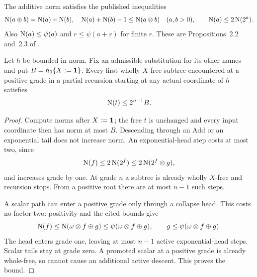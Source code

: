 The additive norm satisfies the published inequalities
\[
 \operatorname{N}(a\oplus b)=\operatorname{N}(a)+\operatorname{N}(b),\quad
 \operatorname{N}(a)+\operatorname{N}(b)-1\le\operatorname{N}(a\otimes b)\quad(a,b>0),
 \qquad \operatorname{N}(a)\le2\operatorname{N}(2^a).
\]
Also $\operatorname{N}(a)\le\psi(a)$ and $r\le\psi(a+r)$ for finite $r$.
These are Propositions~2.2 and~2.3 of \cite{ww}.

\begin{lemma}\label{wwsc:lem:free}
Let $h$ be bounded in norm. Fix an admissible substitution for its other
names and put $B=h_0\{X:=\mathbf1\}$. Every first wholly $X$-free
subtree encountered at a positive grade in a partial recursion starting
at any actual coordinate of $h$ satisfies
\[
 \operatorname{N}(t)\le2^{n-1}B.
\]
\end{lemma}
\begin{proof}
Compute norms after $X:=\mathbf1$; the free $t$ is unchanged and every
input coordinate then has norm at most $B$. Descending through an Add
or an exponential tail does not increase norm. An exponential-head
step costs at most two, since
\[
 \operatorname{N}(f)\le2\operatorname{N}(2^f)\le2\operatorname{N}(2^f\otimes g),
\]
and increases grade by one. At grade $n$ a subtree is already wholly
$X$-free and recursion stops. From a positive root there are at most
$n-1$ such steps.

A scalar path can enter a positive grade only through a collapse head.
This costs no factor two: positivity and the cited bounds give
\[
 \operatorname{N}(f)\le\operatorname{N}(\omega\otimes f\oplus g)
                  \le\psi(\omega\otimes f\oplus g),\qquad
 g\le\psi(\omega\otimes f\oplus g).
\]
The head enters grade one, leaving at most $n-1$ active
exponential-head steps. Scalar tails stay at grade zero. A promoted
scalar at a positive grade is already whole-free, so cannot cause an
additional active descent. This proves the bound.
\end{proof}

